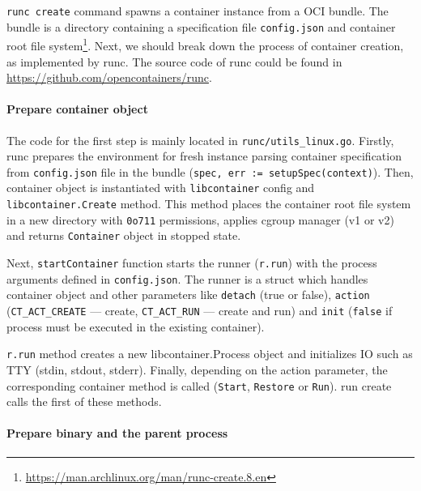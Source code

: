 \texttt{runc create} command spawns a container instance from a OCI bundle. The bundle is a directory containing a specification file \texttt{config.json} and container root file system\footnote{\url{https://man.archlinux.org/man/runc-create.8.en}}. Next, we should break down the process of container creation, as implemented by runc. The source code of runc could be found in \url{https://github.com/opencontainers/runc}.

\paragraph*{Prepare container object}
The code for the first step is mainly located in \linebreak \texttt{runc/utils\_linux.go}. Firstly, runc prepares the environment for fresh instance parsing container specification from \texttt{config.json} file in the bundle \linebreak (\texttt{spec, err := setupSpec(context)}). Then, container object is instantiated with \linebreak \texttt{libcontainer} config and \texttt{libcontainer.Create} method. This method places the container root file system in a new directory with \texttt{0o711} permissions, applies cgroup manager (v1 or v2) and returns \texttt{Container} object in stopped state.

Next, \texttt{startContainer} function starts the runner (\texttt{r.run}) with the process arguments defined in \texttt{config.json}. The runner is a struct which handles container object and other parameters like \texttt{detach} (true or false), \texttt{action} (\texttt{CT\_ACT\_CREATE} — create, \texttt{CT\_ACT\_RUN} — create and run) and \texttt{init} (\texttt{false} if process must be executed in the existing container).

\texttt{r.run} method creates a new libcontainer.Process object and initializes IO such as TTY (stdin, stdout, stderr). Finally, depending on the action parameter, the corresponding container method is called (\texttt{Start}, \texttt{Restore} or \texttt{Run}). run create calls the first of these methods.

\paragraph*{Prepare binary and the parent process}

